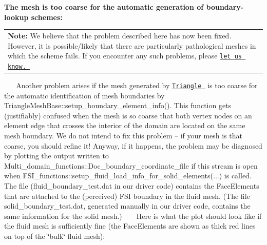 \begin{DoxyItemize}
\item {\bfseries  The mesh is too coarse for the automatic generation of boundary-\/lookup schemes\+:} ~\newline
~\newline
 \begin{center} \tabulinesep=1mm
\begin{longtabu} spread 0pt [c]{*{1}{|X[-1]}|}
\hline
{\bfseries Note\+:} We believe that the problem described here has now been fixed. However, it is possible/likely that there are particularly pathological meshes in which the scheme fails. If you encounter any such problems, please \href{../../../contact/html/index.html}{\tt let us know. }   \\
\end{longtabu}
\end{center}  ~\newline
~\newline
 Another problem arises if the mesh generated by \href{http://www.cs.cmu.edu/~quake/triangle.html}{\tt {\ttfamily Triangle} } is too coarse for the automatic identification of mesh boundaries by {\ttfamily Triangle\+Mesh\+Base\+::setup\+\_\+boundary\+\_\+element\+\_\+info()}. This function gets (justifiably) confused when the mesh is so coarse that both vertex nodes on an element edge that crosses the interior of the domain are located on the same mesh boundary. We do not intend to fix this problem -- if your mesh is that coarse, you should refine it! Anyway, if it happens, the problem may be diagnosed by plotting the output written to {\ttfamily Multi\+\_\+domain\+\_\+functions\+::\+Doc\+\_\+boundary\+\_\+coordinate\+\_\+file} if this stream is open when {\ttfamily F\+S\+I\+\_\+functions\+::setup\+\_\+fluid\+\_\+load\+\_\+info\+\_\+for\+\_\+solid\+\_\+elements}(...) is called. The file ({\ttfamily fluid\+\_\+boundary\+\_\+test.\+dat} in our driver code) contains the {\ttfamily Face\+Elements} that are attached to the (perceived) F\+SI boundary in the fluid mesh. (The file {\ttfamily solid\+\_\+boundary\+\_\+test.\+dat}, generated manually in our driver code, contains the same information for the solid mesh.) ~\newline
~\newline
 Here is what the plot should look like if the fluid mesh is sufficiently fine (the {\ttfamily Face\+Elements} are shown as thick red lines on top of the \char`\"{}bulk\char`\"{} fluid mesh)\+: ~\newline
~\newline
 

\end{DoxyItemize}
